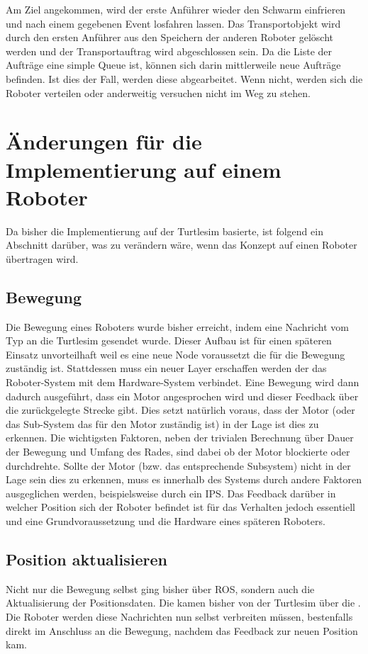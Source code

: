 Am Ziel angekommen, wird der erste Anführer wieder den Schwarm einfrieren und nach einem gegebenen Event losfahren lassen. Das Transportobjekt wird durch den ersten Anführer aus den Speichern der anderen Roboter gelöscht werden und der Transportauftrag wird abgeschlossen sein. Da die Liste der Aufträge eine simple Queue ist, können sich darin mittlerweile neue Aufträge befinden. Ist dies der Fall, werden diese abgearbeitet. Wenn nicht, werden sich die Roboter verteilen oder anderweitig versuchen nicht im Weg zu stehen.

\section{Änderungen für die Implementierung auf einem Roboter}

Da bisher die Implementierung auf der Turtlesim basierte, ist folgend ein Abschnitt darüber, was zu verändern wäre, wenn das Konzept auf einen Roboter übertragen wird.

\subsection*{Bewegung}

Die Bewegung eines Roboters wurde bisher erreicht, indem eine Nachricht vom Typ  an die Turtlesim gesendet wurde. Dieser Aufbau ist für einen späteren Einsatz unvorteilhaft weil es eine neue Node voraussetzt die für die Bewegung zuständig ist. Stattdessen muss ein neuer Layer erschaffen werden der das Roboter-System mit dem Hardware-System verbindet. Eine Bewegung wird dann dadurch ausgeführt, dass ein Motor angesprochen wird und dieser Feedback über die zurückgelegte Strecke gibt. Dies setzt natürlich voraus, dass der Motor (oder das Sub-System das für den Motor zuständig ist) in der Lage ist dies zu erkennen. Die wichtigsten Faktoren, neben der trivialen Berechnung über Dauer der Bewegung und Umfang des Rades, sind dabei ob der Motor blockierte oder durchdrehte. Sollte der Motor (bzw. das entsprechende Subsystem) nicht in der Lage sein dies zu erkennen, muss es innerhalb des Systems durch andere Faktoren ausgeglichen werden, beispielsweise durch ein \ac{IPS}. Das Feedback darüber in welcher Position sich der Roboter befindet ist für das Verhalten jedoch essentiell und eine Grundvoraussetzung und die Hardware eines späteren Roboters.

\subsection*{Position aktualisieren}

Nicht nur die Bewegung selbst ging bisher über ROS, sondern auch die Aktualisierung der Positionsdaten. Die kamen bisher von der Turtlesim über die . Die Roboter werden diese Nachrichten nun selbst verbreiten müssen, bestenfalls direkt im Anschluss an die Bewegung, nachdem das Feedback zur neuen Position kam.



